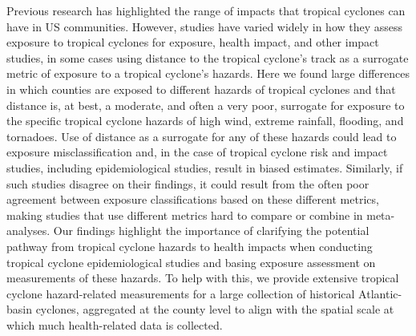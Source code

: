 Previous research has highlighted the range of impacts that tropical cyclones
can have in \ac{US} communities. However, studies have varied widely in how they
assess exposure to tropical cyclones for exposure, health impact, and other
impact studies, in some cases using distance to the tropical cyclone's track as
a surrogate metric of exposure to a tropical cyclone's hazards. Here we found
large differences in which counties are exposed to different hazards of
tropical cyclones and that distance is, at best, a moderate, and often a very
poor, surrogate for exposure to the specific tropical cyclone hazards of high
wind, extreme rainfall, flooding, and tornadoes. Use of distance as a surrogate
for any of these hazards could lead to exposure misclassification and, in the
case of tropical cyclone risk and impact studies, including epidemiological
studies, result in biased estimates.  Similarly, if such studies disagree on
their findings, it could result from the often poor agreement between exposure
classifications based on these different metrics, making studies that use
different metrics hard to compare or combine in meta-analyses. Our findings
highlight the importance of clarifying the potential pathway from tropical
cyclone hazards to health impacts when conducting tropical cyclone
epidemiological studies and basing exposure assessment on measurements of these
hazards. To help with this, we provide extensive tropical cyclone
hazard-related measurements for a large collection of historical Atlantic-basin
cyclones, aggregated at the county level to align with the spatial scale at
which much health-related data is collected.
